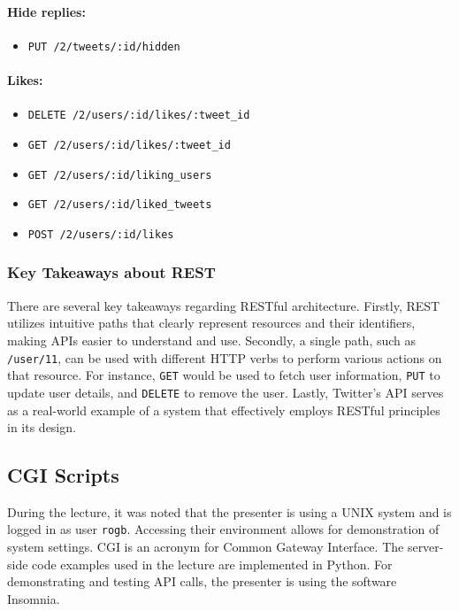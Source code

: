 \paragraph{Hide replies:}
\begin{itemize}[noitemsep, topsep=4pt]
    \item \texttt{PUT /2/tweets/:id/hidden}
\end{itemize}

\paragraph{Likes:}
\begin{itemize}[noitemsep, topsep=4pt]
    \item \texttt{DELETE /2/users/:id/likes/:tweet\_id}
    \item \texttt{GET /2/users/:id/likes/:tweet\_id}
    \item \texttt{GET /2/users/:id/liking\_users}
    \item \texttt{GET /2/users/:id/liked\_tweets}
    \item \texttt{POST /2/users/:id/likes}
\end{itemize}

\subsubsection{Key Takeaways about REST}

There are several key takeaways regarding RESTful architecture. Firstly, REST utilizes intuitive paths that clearly represent resources and their identifiers, making APIs easier to understand and use. Secondly, a single path, such as \texttt{/user/11}, can be used with different HTTP verbs to perform various actions on that resource. For instance, \texttt{GET} would be used to fetch user information, \texttt{PUT} to update user details, and \texttt{DELETE} to remove the user. Lastly, Twitter's API serves as a real-world example of a system that effectively employs RESTful principles in its design.

\subsection{CGI Scripts}
During the lecture, it was noted that the presenter is using a UNIX system and is logged in as user \texttt{rogb}. Accessing their environment allows for demonstration of system settings.  CGI is an acronym for Common Gateway Interface. The server-side code examples used in the lecture are implemented in Python. For demonstrating and testing API calls, the presenter is using the software Insomnia.

